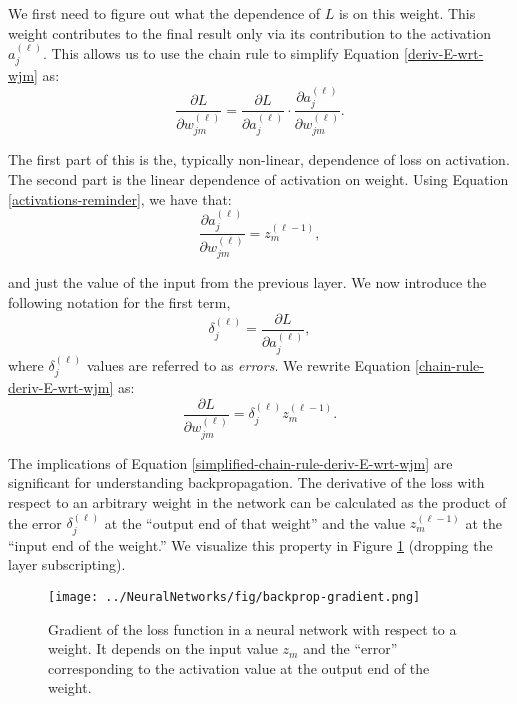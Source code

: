 We first need to figure out what the dependence of $L$ is on this weight. This weight contributes to the final result only via its contribution to the activation $a^{(\ell)}_{j}$. This allows us to use the chain rule to simplify Equation \ref{deriv-E-wrt-wjm} as:
%
\begin{equation} \label{chain-rule-deriv-E-wrt-wjm}
	\frac{\partial L}{\partial w^{(\ell)}_{jm}} = \frac{\partial L}{\partial a^{(\ell)}_{j}} \cdot \frac{\partial a^{(\ell)}_{j}}{\partial w^{(\ell)}_{jm}}.
      \end{equation}

      The first part of this is the, typically non-linear, dependence of loss on activation. The second part is the linear dependence of activation on weight.
Using Equation \ref{activations-reminder}, we have that:
\begin{equation*}
	\frac{\partial a^{(\ell)}_{j}}{\partial w^{(\ell)}_{jm}} = z^{(\ell-1)}_{m},
\end{equation*}

and just the value of the input from the previous layer. We now introduce the following notation for the first term,
%
\begin{equation} \label{delta-expression}
	\delta^{(\ell)}_{j} = \frac{\partial L}{\partial a^{(\ell)}_{j}},
\end{equation}
where $\delta^{(\ell)}_{j}$ values are referred to as \textit{errors}. We rewrite Equation \ref{chain-rule-deriv-E-wrt-wjm} as:
%
\begin{equation} \label{simplified-chain-rule-deriv-E-wrt-wjm}
	\frac{\partial L}{\partial w^{(\ell)}_{jm}} = \delta^{(\ell)}_{j} z^{(\ell-1)}_{m}.
\end{equation}

The implications of Equation \ref{simplified-chain-rule-deriv-E-wrt-wjm} are significant for understanding backpropagation.  The derivative of the loss with respect to an arbitrary weight in the network
can be calculated as the product of the error $\delta^{(\ell)}_j$ at the ``output end of that weight'' and the value $z^{(\ell-1)}_m$ at the ``input end of the weight.''  We visualize this property in Figure \ref{fig:backprop-gradient} (dropping the layer subscripting).
%
\begin{figure}
    \centering
    \texttt{[image: ../NeuralNetworks/fig/backprop-gradient.png]}
    \caption{Gradient of the loss function in a neural network with respect to a weight. It depends on the input value $z_m$ and the ``error'' corresponding to the activation value at the output end of the weight.}
    \label{fig:backprop-gradient}
\end{figure}

